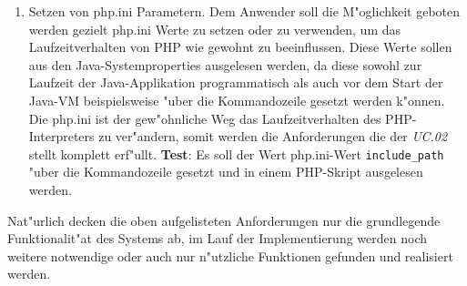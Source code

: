 \begin{enumerate}
\item Setzen von php.ini Parametern. Dem Anwender soll die M"oglichkeit geboten werden gezielt php.ini Werte zu setzen oder zu verwenden,
    um das Laufzeitverhalten von PHP wie gewohnt zu beeinflussen. Diese Werte sollen aus den Java-Systemproperties ausgelesen werden,
    da diese sowohl zur Laufzeit der Java-Applikation programmatisch als auch vor dem Start der Java-VM beispielsweise "uber die Kommandozeile
    gesetzt werden k"onnen. Die php.ini ist der gew"ohnliche Weg das Laufzeitverhalten des PHP-Interpreters zu ver"andern, somit werden
    die Anforderungen die der  \emph{UC.02} stellt komplett erf"ullt.
    \textbf{Test}: Es soll der Wert php.ini-Wert \texttt{include\_path} "uber die Kommandozeile gesetzt und in einem
    PHP-Skript ausgelesen werden. 

\end{enumerate}

Nat"urlich decken die oben aufgelisteten Anforderungen nur die grundlegende Funktionalit"at des Systems ab, im Lauf der Implementierung werden
noch weitere notwendige oder auch nur n"utzliche Funktionen gefunden und realisiert werden.
